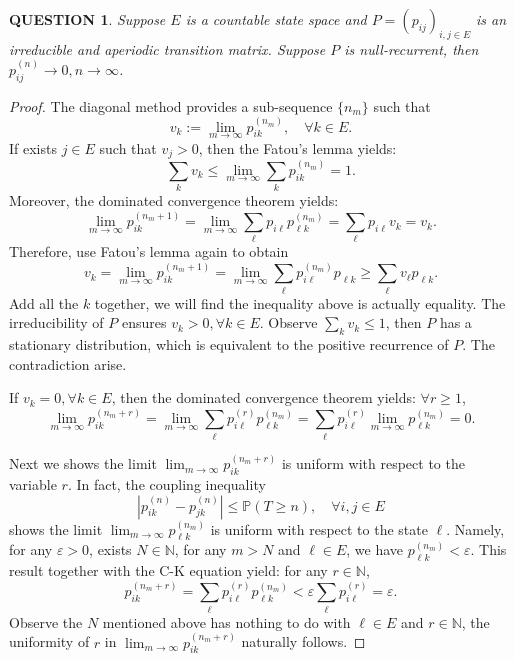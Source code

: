 \documentclass[12pt]{article}
\renewcommand{\(}{\left(}%
\renewcommand{\)}{\right)}%
\renewcommand{\[}{\left[}%
\renewcommand{\]}{\right]}%
\newcommand{\p}{\mathbb{P}}
\newcommand{\n}{\mathbb{N}}
\newtheorem{question}{QUESTION}[section]}
\newtheorem{proof}{Proof.}}
\begin{document}
  \begin{question}
  	Suppose $E$ is a countable state space and $P=(p_{ij})_{i,j\in E}$ is an irreducible and aperiodic transition matrix. Suppose $P$ is null-recurrent, then $p_{ij}^{(n)}\to0,n\to\infty$.
  \end{question}
  \begin{proof}
  	The diagonal method provides a sub-sequence $\{n_m\}$ such that 
  	\begin{equation*}
  		v_k:=\lim_{m\to\infty}p_{ik}^{(n_m)},\quad\forall k\in E.
  	\end{equation*}
  	If exists $j\in E$ such that $v_j>0$, then the Fatou's lemma yields:
  	\begin{equation*}
  		\sum_{k}v_k\leq \lim_{m\to\infty}\sum_k p_{ik}^{(n_m)}=1.
  	\end{equation*}
  	Moreover, the dominated convergence theorem yields:
  	\begin{equation*}
  		\lim_{m\to\infty}p_{ik}^{(n_m+1)}=\lim_{m\to\infty}\sum_{\ell}p_{i\ell}p_{\ell k}^{(n_m)}=\sum_{\ell}p_{i\ell}v_k=v_k.
  	\end{equation*}
  	Therefore, use Fatou's lemma again to obtain
  	\begin{equation*}
  		v_k=\lim_{m\to\infty}p_{ik}^{(n_m+1)}=\lim_{m\to\infty}\sum_{\ell}p_{i\ell}^{(n_m)}p_{\ell k}\geq \sum_\ell v_\ell p_{\ell k}.
  	\end{equation*}
  	Add all the $k$ together, we will find the inequality above is actually equality. The irreducibility of $P$ ensures $v_k>0,\forall k\in E$. Observe $\sum_kv_k\leq 1$, then $P$ has a stationary distribution, which is equivalent to the positive recurrence of $P$. The contradiction arise.
  	
  	If $v_k=0,\forall k\in E$, then the dominated convergence theorem yields: $\forall r\geq 1$,
  	\begin{equation*}
  		\lim_{m\to\infty}p_{ik}^{(n_m+r)}=\lim_{m\to\infty}\sum_\ell p_{i\ell}^{(r)}p_{\ell k}^{(n_m)}=\sum_\ell p_{i\ell}^{(r)}\lim_{m\to\infty}p_{\ell k}^{(n_m)}=0.
  	\end{equation*}
  	
  	Next we shows the limit $\lim_{m\to\infty}p_{ik}^{(n_m+r)}$ is uniform with respect to the variable $r$. In fact, the coupling inequality 
  	\begin{equation*}
  		|p_{ik}^{(n)}-p_{jk}^{(n)}|\leq \p(T\geq n),\quad \forall i,j\in E
  	\end{equation*}
  	shows the limit $\lim_{m\to\infty}p_{\ell k}^{(n_m)}$ is uniform with respect to the state $\ell$. Namely, for any $\varepsilon>0$, exists $N\in\n$, for any $m>N$ and $\ell\in E$, we have $p_{\ell k}^{(n_m)}<\varepsilon$. This result together with the C-K equation yield: for any $r\in\n$,
  	\begin{equation*}
  		p_{ik}^{(n_m+r)}=\sum_\ell p_{i\ell}^{(r)}p_{\ell k}^{(n_m)}<\varepsilon\sum_\ell p_{i\ell}^{(r)}=\varepsilon.
  	\end{equation*}
  	Observe the $N$ mentioned above has nothing to do with $\ell\in E$ and $r\in\n$, the uniformity of $r$ in $\lim_{m\to\infty}p_{ik}^{(n_m+r)}$ naturally follows.
  	

\end{proof}
\end{document}
